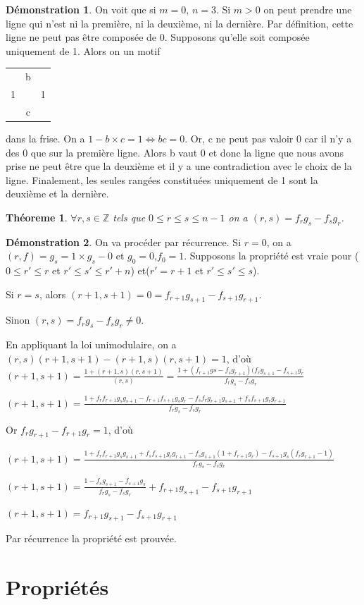 \documentclass[a4paper]{article}
\theoremstyle{plain}
\newtheorem{thm}{Théoreme}[section]
\theoremstyle{definition}
\theoremstyle{proof}
\newtheorem{dem}{Démonstration}
\theoremstyle{remark}
\begin{document}
\begin{dem}
On voit que si $m=0$, $n=3$.
Si $m>0$ on peut prendre une ligne qui n'est ni la première, ni la deuxième, ni la dernière. Par définition, cette ligne ne peut pas être composée de 0. Supposons qu'elle soit composée uniquement de 1. Alors on un motif \begin{tabular}{ccc}
&b&\\1&&1\\&c&
\end{tabular} dans la frise. On a $1-b\times c=1 \Leftrightarrow bc=0$. Or, c ne peut pas valoir 0 car il n'y a des 0 que sur la première ligne. Alors b vaut 0 et donc la ligne que nous avons prise ne peut être que la deuxième et il y a une contradiction avec le choix de la ligne.
Finalement, les seules rangées constituées uniquement de 1 sont la deuxième et la dernière.
\end{dem}

\begin{thm}
$\forall r,s \in \mathbb{Z}$ tels que $0\le r\le s\le n-1$ on a $(r,s)=f_rg_s-f_sg_r$.
\end{thm}
\begin{dem}
On va procéder par récurrence.
Si $r=0$, on a $(r,f)=g_s=1\times g_s -0$ et $g_0=0$,$f_0=1$.
Supposons la propriété est vraie pour ($0\le r'\le r$ et $r'\le s'\le r'+n$) et($r'=r+1$ et $r'\le s'\le s$).

Si $r=s$, alors $(r+1,s+1)=0=f_{r+1}g_{s+1}-f_{s+1}g_{r+1}$. 

Sinon $(r,s)=f_rg_s-f_sg_r \neq 0$.

En appliquant la loi unimodulaire, on a $(r,s)(r+1,s+1)-(r+1,s)(r,s+1)=1$, d'où $(r+1,s+1)=\frac{1+(r+1,s)(r,s+1)}{(r,s)}=\frac{1+(f_{r+1}g{s}-f_sg_{r+1})(f_rg_{s+1}-f_{s+1}g_r}{f_rg_s-f_sg_r}$

$(r+1,s+1)=\frac{1+f_rf_{r+1}g_sg_{s+1}-f_{r+1}f_{s+1}g_sg_r-f_sf_rg_{r+1}g_{s+1}+f_sf_{s+1}g_rg_{r+1}}{f_rg_s-f_sg_r}$

Or $f_rg_{r+1}-f_{r+1}g_r=1$, d'où 

$(r+1,s+1)=\frac{1+f_rf_{r+1}g_sg_{s+1}+f_sf_{s+1}g_rg_{r+1}-f_sg_{s+1}(1+f_{r+1}g_r)-f_{s+1}g_s(f_rg_{r+1}-1)}{f_rg_s-f_sg_r}$

$(r+1,s+1)=\frac{1-f_sg_{s+1}-f_{s+1}g_s}{f_rg_s-f_sg_r}+f_{r+1}g_{s+1}-f_{s+1}g_{r+1}$

$(r+1,s+1)=f_{r+1}g_{s+1}-f_{s+1}g_{r+1}$

Par récurrence la propriété est prouvée.
\end{dem}
\part{Propriétés}
\end{document}
